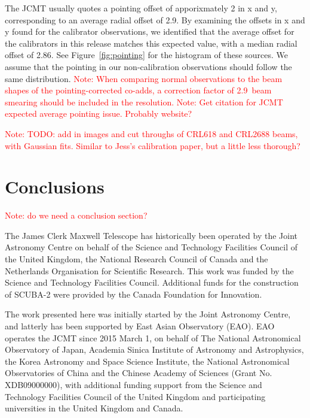 \documentclass[twocolumn,times]{aastex6}
\newcommand{\note}[1]{\textcolor{red}{Note: #1}}
\begin{document}
The JCMT usually quotes a pointing offset of apporixmately 2\arcsec{}
in x and y, corresponding to an average radial offset of
2.9\arcsec{}. By examining the offsets in x and y found for the
calibrator observations, we identified that the average offset for the
calibrators in this release matches this expected value, with a median
radial offset of 2.86\arcsec{}. See Figure~\ref{fig:pointing} for the
histogram of these sources. We assume that the pointing in our
non-calibration observations should follow the same distribution. \note{When
comparing normal observations to the beam shapes of the
pointing-corrected co-adds, a correction factor of 2.9\arcsec\ beam
smearing should be included in the resolution.}
\note{Get citation for JCMT expected average pointing issue. Probably
  website?}

\note{TODO: add in images and cut throughs of CRL618 and CRL2688
  beams, with Gaussian fits. Similar to Jess's calibration paper, but
  a little less thorough?}






\section{Conclusions}
\note{do we need a conclusion section?}

\acknowledgments
The James Clerk Maxwell Telescope has historically been operated by
the Joint Astronomy Centre on behalf of the Science and Technology
Facilities Council of the United Kingdom, the National Research
Council of Canada and the Netherlands Organisation for Scientific
Research. This work was funded by the Science and Technology
Facilities Council.  Additional funds for the construction of SCUBA-2
were provided by the Canada Foundation for Innovation.

The work presented here was initially started by the Joint Astronomy
Centre, and latterly has been supported by East Asian Observatory (EAO).
EAO operates the JCMT since 2015 March 1, on behalf of The
National Astronomical Observatory of Japan, Academia Sinica Institute
of Astronomy and Astrophysics, the Korea Astronomy and Space Science
Institute, the National Astronomical Observatories of China and the
Chinese Academy of Sciences (Grant No. XDB09000000), with additional
funding support from the Science and Technology Facilities Council of
the United Kingdom and participating universities in the United
Kingdom and Canada.
\end{document}
